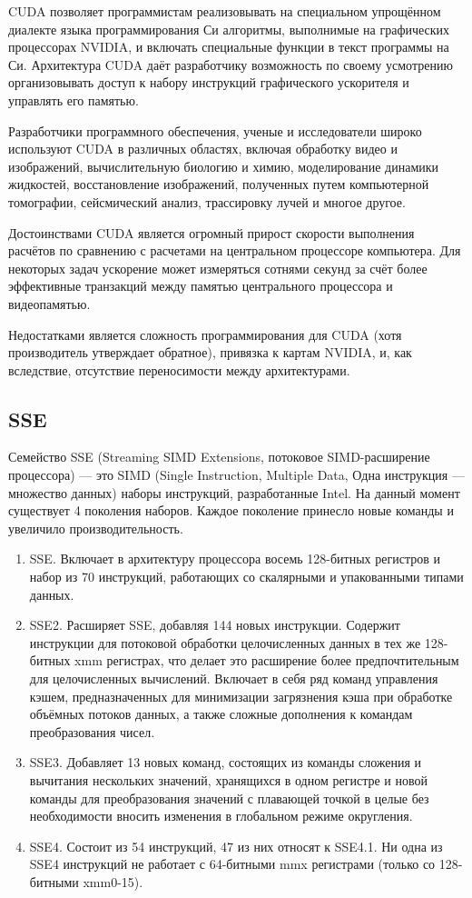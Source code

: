 CUDA  позволяет программистам реализовывать на специальном упрощённом диалекте языка программирования Си алгоритмы, выполнимые на графических процессорах NVIDIA, и включать специальные функции в текст программы на Си. \cite{bib5} Архитектура CUDA даёт разработчику возможность по своему усмотрению организовывать доступ к набору инструкций графического ускорителя и управлять его памятью.

Разработчики программного обеспечения, ученые и исследователи широко используют CUDA в различных областях, включая обработку видео и изображений, вычислительную биологию и химию, моделирование динамики жидкостей, восстановление изображений, полученных путем компьютерной томографии, сейсмический анализ, трассировку лучей и многое другое.

Достоинствами CUDA является огромный прирост скорости выполнения расчётов по сравнению с расчетами на центральном процессоре компьютера. Для некоторых задач ускорение может измеряться сотнями секунд за счёт более эффективные транзакций между памятью центрального процессора и видеопамятью.

Недостатками является сложность программирования для CUDA (хотя производитель утверждает обратное), привязка к картам NVIDIA, и, как вследствие, отсутствие переносимости между архитектурами.


\subsection{SSE}
Семейство SSE (Streaming SIMD Extensions, потоковое SIMD-расширение процессора) — это SIMD (Single Instruction, Multiple Data, Одна инструкция — множество данных) наборы инструкций, разработанные Intel. На данный момент существует 4 поколения наборов. Каждое поколение принесло новые команды и увеличило производительность.\cite{bib2} 

\begin{enumerate}
	\item SSE. Включает в архитектуру процессора восемь 128-битных регистров и набор из 70 инструкций, работающих со скалярными и упакованными типами данных.
	\item SSE2. Расширяет SSE, добавляя 144 новых инструкции. Содержит инструкции для потоковой обработки целочисленных данных в тех же 128-битных xmm регистрах, что делает это расширение более предпочтительным для целочисленных вычислений. Включает в себя ряд команд управления кэшем, предназначенных для минимизации загрязнения кэша при обработке объёмных потоков данных, а также сложные дополнения к командам преобразования чисел.
	\item SSE3. Добавляет 13 новых команд, состоящих из команды сложения и вычитания нескольких значений, хранящихся в одном регистре и новой команды для преобразования значений с плавающей точкой в целые без необходимости вносить изменения в глобальном режиме округления.
	\item SSE4. Состоит из 54 инструкций, 47 из них относят к SSE4.1. Ни одна из SSE4 инструкций не работает с 64-битными mmx регистрами (только со 128-битными xmm0-15).
\end{enumerate}

